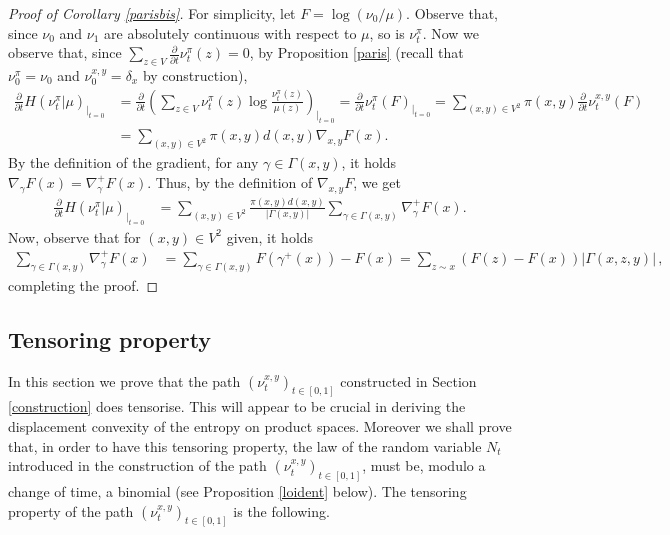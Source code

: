 \documentclass[11pt]{amsart}
\numberwithin{equation}{section}
\begin{document}
\begin{proof}[Proof of Corollary \ref{parisbis}]
For simplicity, let $F=\log (\nu_0/\mu)$. Observe that, since $\nu_0$ and $\nu_1$ are absolutely continuous with respect to $\mu$, so is $\nu_t^\pi$.
Now we observe that, since $\sum_{z \in V} \frac{\partial}{\partial t} \nu_t^\pi(z)=0$,  by Proposition \ref{paris}
(recall that $\nu_0^\pi=\nu_0$ and $\nu_0^{x,y}=\delta_x$ by construction),
\begin{align*}
\frac{\partial}{\partial t} H(\nu_t^\pi | \mu)_{|_{t=0}} 
& = 
\frac{\partial}{\partial t} \left( \sum_{z \in V}  \nu_t^\pi(z)  \log \frac{\nu_t^\pi(z)}{\mu(z)} \right)_{|_{t=0}}
=
\frac{\partial}{\partial t} \nu_t^\pi (F)_{|_{t=0}} 
 =
\sum_{(x,y) \in V^2} \pi(x,y) \frac{\partial}{\partial t} \nu_t^{x,y}(  F ) \\
& =
\sum_{(x,y) \in V^2} \pi(x,y) d(x,y) \nabla_{x,y}   F  (x) .
\end{align*}
By the definition of the gradient, for any $\gamma \in \Gamma(x,y)$, it holds
$\nabla_\gamma   F(x)
=
 \nabla_\gamma^+   F(x)$. Thus, by the definition of $\nabla_{x,y}F$, we get
\begin{align*}
\frac{\partial}{\partial t} H(\nu_t^\pi | \mu)_{|_{t=0}} 
& =
\sum_{(x,y) \in V^2} \frac{\pi(x,y) d(x,y)}{|\Gamma(x,y)|} \sum_{\gamma \in \Gamma(x,y)}  \nabla_\gamma^+ F (x).
\end{align*} 
Now, observe that for $(x,y)\in V^2$ given, it holds
\begin{align*}
\sum_{\gamma \in \Gamma(x,y)}\nabla_\gamma^+F(x)&=\sum_{\gamma \in \Gamma(x,y)}F(\gamma^+(x))-F(x)=\sum_{z\sim x} (F(z)-F(x)) |\Gamma(x,z,y)|\,,
\end{align*}
completing the proof.
\end{proof}

\subsection{Tensoring property}

In this section we prove that the path $(\nu_t^{x,y})_{t\in[0,1]}$ constructed in Section \ref{construction} does tensorise. This will appear to be crucial in deriving the displacement convexity of the entropy on product spaces. Moreover we shall prove that, in order to have this tensoring property, the law of the random variable $N_t$ introduced in the construction of the path $(\nu_t^{x,y})_{t\in[0,1]}$,  must be, modulo a change of time, a binomial (see Proposition \ref{loident} below).  
The tensoring property of  the path $(\nu_t^{x,y})_{t\in[0,1]}$  is the following.
\end{document}

